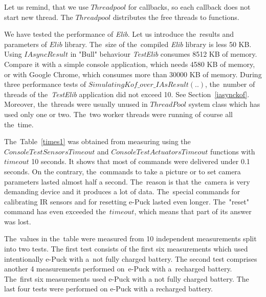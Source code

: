   \begin{remark}
   Let us remind, that we use $Threadpool$ for callbacks, so each callback
   does not start new thread.
   The $Threadpool$ distributes the free threads to functions.
  \end{remark}
  We have tested the performance of {\it Elib}. Let us introduce 
  the~results and parameters of $Elib$ library.
  The~size of the~compiled {\it Elib} library is less 50 KB.
  Using $IAsyncResult$ in "Bull" behaviour  {\it TestElib} consumes 8512 KB of memory.
  Compare it with a simple console application, which needs 4580 KB of memory, or with Google Chrome, 
  which consumes more than 30000 KB of memory.
  During three performance tests of $SimulatingKof\_over\_IAsResult(..)$,
  the~number of threads of the~{\it TestElib} application did not exceed 10. 
  See Section~\ref{iasynckof}. Moreover, the~threads were usually unused
  in $ThreadPool$ system class which has used only one or two. 
  The~two worker threads were running of course all the~time.

  The~Table~\ref{times1}  was obtained from measuring using the~$ConsoleTestSensorsTimeout$ and
  $ConsoleTestActuatorsTimeout$ functions with $timeout$ 10 seconds.
  It shows that most of commands were delivered under 0.1 seconds. 
  On the contrary, the~commands to take a picture or to set camera parameters 
   lasted almost half a second. 
  The~reason is that the~camera is very demanding device and it produces a lot of data.
  The~special commands for calibrating IR sensors and for resetting e-Puck lasted even longer.
  The~"reset" command has even exceeded the~$timeout$,
  which means that part of its answer was lost.

  The~values in the~table were measured from 10 independent measurements split into two tests. 
  The first test consists of the first six measurements which used intentionally e-Puck with
  a~not fully charged battery. The second test comprises another 4 measurements performed
  on~e-Puck with a~recharged battery.
  The~first six measurements used e-Puck with a not fully charged battery.
  The last four tests were performed on e-Puck with a recharged battery.


